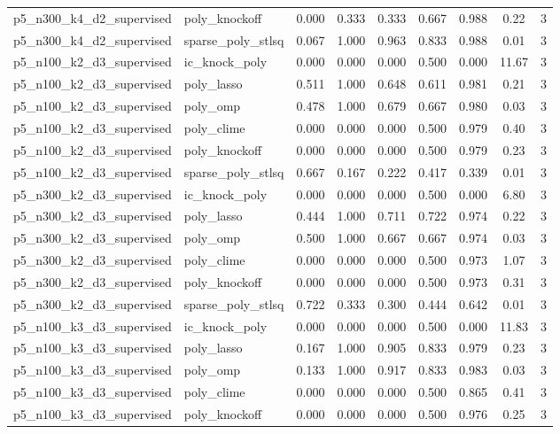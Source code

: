 \documentclass[12pt,a4paper]{article}
\begin{document}
\begin{table}[htbp]
{\begin{tabular}{llccccccc}
  p5\_n300\_k4\_d2\_supervised & poly\_knockoff & 0.000 & 0.333 & 0.333 & 0.667 & 0.988 & 0.22 & 3 \\
  p5\_n300\_k4\_d2\_supervised & sparse\_poly\_stlsq & 0.067 & 1.000 & 0.963 & 0.833 & 0.988 & 0.01 & 3 \\
  p5\_n100\_k2\_d3\_supervised & ic\_knock\_poly & 0.000 & 0.000 & 0.000 & 0.500 & 0.000 & 11.67 & 3 \\
  p5\_n100\_k2\_d3\_supervised & poly\_lasso & 0.511 & 1.000 & 0.648 & 0.611 & 0.981 & 0.21 & 3 \\
  p5\_n100\_k2\_d3\_supervised & poly\_omp & 0.478 & 1.000 & 0.679 & 0.667 & 0.980 & 0.03 & 3 \\
  p5\_n100\_k2\_d3\_supervised & poly\_clime & 0.000 & 0.000 & 0.000 & 0.500 & 0.979 & 0.40 & 3 \\
  p5\_n100\_k2\_d3\_supervised & poly\_knockoff & 0.000 & 0.000 & 0.000 & 0.500 & 0.979 & 0.23 & 3 \\
  p5\_n100\_k2\_d3\_supervised & sparse\_poly\_stlsq & 0.667 & 0.167 & 0.222 & 0.417 & 0.339 & 0.01 & 3 \\
  p5\_n300\_k2\_d3\_supervised & ic\_knock\_poly & 0.000 & 0.000 & 0.000 & 0.500 & 0.000 & 6.80 & 3 \\
  p5\_n300\_k2\_d3\_supervised & poly\_lasso & 0.444 & 1.000 & 0.711 & 0.722 & 0.974 & 0.22 & 3 \\
  p5\_n300\_k2\_d3\_supervised & poly\_omp & 0.500 & 1.000 & 0.667 & 0.667 & 0.974 & 0.03 & 3 \\
  p5\_n300\_k2\_d3\_supervised & poly\_clime & 0.000 & 0.000 & 0.000 & 0.500 & 0.973 & 1.07 & 3 \\
  p5\_n300\_k2\_d3\_supervised & poly\_knockoff & 0.000 & 0.000 & 0.000 & 0.500 & 0.973 & 0.31 & 3 \\
  p5\_n300\_k2\_d3\_supervised & sparse\_poly\_stlsq & 0.722 & 0.333 & 0.300 & 0.444 & 0.642 & 0.01 & 3 \\
  p5\_n100\_k3\_d3\_supervised & ic\_knock\_poly & 0.000 & 0.000 & 0.000 & 0.500 & 0.000 & 11.83 & 3 \\
  p5\_n100\_k3\_d3\_supervised & poly\_lasso & 0.167 & 1.000 & 0.905 & 0.833 & 0.979 & 0.23 & 3 \\
  p5\_n100\_k3\_d3\_supervised & poly\_omp & 0.133 & 1.000 & 0.917 & 0.833 & 0.983 & 0.03 & 3 \\
  p5\_n100\_k3\_d3\_supervised & poly\_clime & 0.000 & 0.000 & 0.000 & 0.500 & 0.865 & 0.41 & 3 \\
  p5\_n100\_k3\_d3\_supervised & poly\_knockoff & 0.000 & 0.000 & 0.000 & 0.500 & 0.976 & 0.25 & 3 \\

\end{tabular}}
\end{table}
\end{document}
